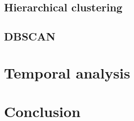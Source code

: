 \documentclass[12pt]{article}
\begin{document}
\subsection{Hierarchical clustering}

\subsection{DBSCAN}

\section{Temporal analysis}

\section{Conclusion}





%
\end{document}
